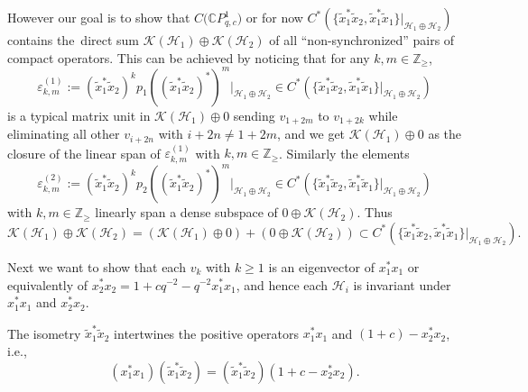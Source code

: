 However our goal is to show that $C\big(\mathbb{C}P_{q,c}^{1}\big) $ or
for now $C^{\ast} ( \{ \tilde{x}_{1}^{\ast}\tilde{x}_{2},\tilde
{x}_{1}^{\ast}\tilde{x}_{1} \} |_{\mathcal{H}_{1}\oplus\mathcal{H}_{2}
} ) $ contains the\ direct sum $\mathcal{K} ( \mathcal{H}
_{1} ) \oplus\mathcal{K}( \mathcal{H}_{2} ) $ of all
``non-synchronized'' pairs of compact
operators. This can be achieved by noticing that for any $k,m\in
\mathbb{Z}_{\geq}$,
\[
\varepsilon_{k,m}^{( 1) }:=( \tilde{x}_{1}^{\ast}\tilde
{x}_{2}) ^{k}p_{1}( ( \tilde{x}_{1}^{\ast}\tilde{x}%
_{2}) ^{\ast}) ^{m}|_{\mathcal{H}_{1}\oplus\mathcal{H}_{2}}\in
C^{\ast}( \{ \tilde{x}_{1}^{\ast}\tilde{x}_{2},\tilde{x}_{1}%
^{\ast}\tilde{x}_{1}\} |_{\mathcal{H}_{1}\oplus\mathcal{H}_{2}})
\]
is a typical matrix unit in $\mathcal{K}( \mathcal{H}_{1})
\oplus0$ sending $v_{1+2m}$ to $v_{1+2k}$ while eliminating all other
$v_{i+2n}$ with $i+2n\neq1+2m$, and we get $\mathcal{K}( \mathcal{H}%
_{1}) \oplus0$ as the closure of the linear span of $\varepsilon
_{k,m}^{( 1) }$ with $k,m\in\mathbb{Z}_{\geq}$. Similarly the
elements
\[
\varepsilon_{k,m}^{(2) }:=( \tilde{x}_{1}^{\ast}\tilde
{x}_{2}) ^{k}p_{2}( ( \tilde{x}_{1}^{\ast}\tilde{x}%
_{2}) ^{\ast}) ^{m}|_{\mathcal{H}_{1}\oplus\mathcal{H}_{2}}\in
C^{\ast}( \{ \tilde{x}_{1}^{\ast}\tilde{x}_{2},\tilde{x}_{1}%
^{\ast}\tilde{x}_{1}\} |_{\mathcal{H}_{1}\oplus\mathcal{H}_{2}})
\]
with $k,m\in\mathbb{Z}_{\geq}$ linearly span a dense subspace of
$0\oplus\mathcal{K}( \mathcal{H}_{2}) $. Thus
\[
\mathcal{K}( \mathcal{H}_{1}) \oplus\mathcal{K}(
\mathcal{H}_{2}) =( \mathcal{K}( \mathcal{H}_{1})
\oplus0) +( 0\oplus\mathcal{K}( \mathcal{H}_{2})
) \subset C^{\ast}( \{ \tilde{x}_{1}^{\ast}\tilde{x}%
_{2},\tilde{x}_{1}^{\ast}\tilde{x}_{1}\} |_{\mathcal{H}_{1}%
\oplus\mathcal{H}_{2}}) .
\]


Next we want to show that each $v_{k}$ with $k\geq1$ is an eigenvector of
$x_{1}^{\ast}x_{1}$ or equivalently of $x_{2}^{\ast}x_{2}=1+cq^{-2}%
-q^{-2}x_{1}^{\ast}x_{1}$, and hence each $\mathcal{H}_{i}$ is invariant under
$x_{1}^{\ast}x_{1}$ and $x_{2}^{\ast}x_{2}$.

\begin{proposition}\label{intertwine} The isometry $\tilde{x}_{1}^{\ast}\tilde{x}_{2}$
intertwines the positive operators $x_{1}^{\ast}x_{1}$ and $(
1+c) -x_{2}^{\ast}x_{2}$, i.e.,
\[
( x_{1}^{\ast}x_{1}) ( \tilde{x}_{1}^{\ast}\tilde{x}%
_{2}) =( \tilde{x}_{1}^{\ast}\tilde{x}_{2}) (
1+c-x_{2}^{\ast}x_{2}) .
\]
\end{proposition}

